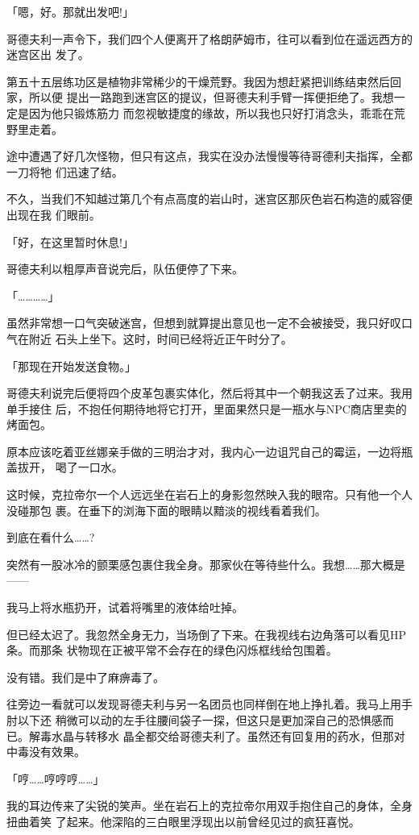 \documentclass[11pt]{book}
\begin{document}
「嗯，好。那就出发吧!」

哥德夫利一声令下，我们四个人便离开了格朗萨姆市，往可以看到位在遥远西方的迷宫区出
发了。

第五十五层练功区是植物非常稀少的干燥荒野。我因为想赶紧把训练结束然后回家，所以便
提出一路跑到迷宫区的提议，但哥德夫利手臂一挥便拒绝了。我想一定是因为他只锻炼筋力
而忽视敏捷度的缘故，所以我也只好打消念头，乖乖在荒野里走着。

途中遭遇了好几次怪物，但只有这点，我实在没办法慢慢等待哥德利夫指挥，全都一刀将牠
们迅速了结。

不久，当我们不知越过第几个有点高度的岩山时，迷宫区那灰色岩石构造的威容便出现在我
们眼前。

「好，在这里暂时休息!」

哥德夫利以粗厚声音说完后，队伍便停了下来。

「…………」

虽然非常想一口气突破迷宫，但想到就算提出意见也一定不会被接受，我只好叹口气在附近
石头上坐下。这时，时间已经将近正午时分了。

「那现在开始发送食物。」

哥德夫利说完后便将四个皮革包裹实体化，然后将其中一个朝我这丢了过来。我用单手接住
后，不抱任何期待地将它打开，里面果然只是一瓶水与NPC商店里卖的烤面包。

原本应该吃着亚丝娜亲手做的三明治才对，我内心一边诅咒自己的霉运，一边将瓶盖拔开，
喝了一口水。

这时候，克拉帝尔一个人远远坐在岩石上的身影忽然映入我的眼帘。只有他一个人没碰那包
裹。在垂下的浏海下面的眼睛以黯淡的视线看着我们。

到底在看什么……?

突然有一股冰冷的颤栗感包裹住我全身。那家伙在等待些什么。我想……那大概是——

我马上将水瓶扔开，试着将嘴里的液体给吐掉。

但已经太迟了。我忽然全身无力，当场倒了下来。在我视线右边角落可以看见HP条。而那条
状物现在正被平常不会存在的绿色闪烁框线给包围着。

没有错。我们是中了麻痹毒了。

往旁边一看就可以发现哥德夫利与另一名团员也同样倒在地上挣扎着。我马上用手肘以下还
稍微可以动的左手往腰间袋子一探，但这只是更加深自己的恐惧感而已。解毒水晶与转移水
晶全都交给哥德夫利了。虽然还有回复用的药水，但那对中毒没有效果。

「哼……哼哼哼……」

我的耳边传来了尖锐的笑声。坐在岩石上的克拉帝尔用双手抱住自己的身体，全身扭曲着笑
了起来。他深陷的三白眼里浮现出以前曾经见过的疯狂喜悦。
\end{document}

